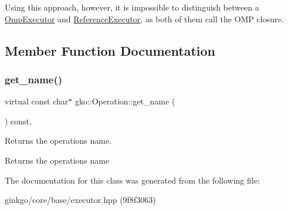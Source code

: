 Using this approach, however, it is impossible to distinguish between a \hyperlink{classgko_1_1OmpExecutor}{Omp\+Executor} and \hyperlink{classgko_1_1ReferenceExecutor}{Reference\+Executor}, as both of them call the O\+MP closure. 

\subsection{Member Function Documentation}
\mbox{\label{classgko_1_1Operation_ab3b940849d1daf02830f3387c52888d0}} 
\subsubsection{\texorpdfstring{get\+\_\+name()}{get\_name()}}
{\footnotesize\ttfamily virtual const char$\ast$ gko\+::\+Operation\+::get\+\_\+name (\begin{DoxyParamCaption}{ }\end{DoxyParamCaption}) const\hspace{0.3cm}{\ttfamily [virtual]}, {\ttfamily [noexcept]}}



Returns the operation\textquotesingle{}s name. 

\begin{DoxyReturn}{Returns}
the operation\textquotesingle{}s name 
\end{DoxyReturn}


The documentation for this class was generated from the following file\+:\begin{DoxyCompactItemize}
\item 
ginkgo/core/base/executor.\+hpp (9f8f3063)\end{DoxyCompactItemize}
